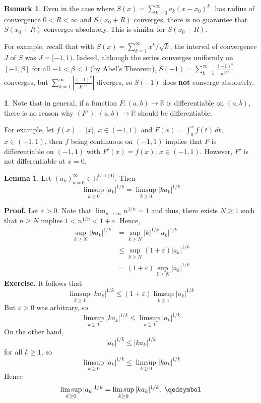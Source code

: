 \documentclass[11pt]{article}
\theoremstyle{definition}
\newtheorem{lemma}[thm]{Lemma}
\newtheorem{remark}[thm]{Remark}
\newtheorem{none}[thm]{}
\newcommand{\mbN}{\ensuremath{\mathbb{N}}}
\newcommand{\mbR}{\ensuremath{\mathbb{R}}}
\newcommand{\powerseries}{\ensuremath{S(x) = \sum_{k=0}^\infty a_k (x - x_0)^k \text{ }}}
\begin{document}
\begin{remark}
Even in the case where \powerseries has radius of convergence $0 < R < \infty$ and $S(x_0 + R)$ converges, there is no guarantee that $S(x_0 + R)$ converges absolutely. This is similar for $S(x_0 - R)$.

For example, recall that with $S(x) = \sum_{k=1}^\infty x^k / \sqrt{k}$, the interval of convergence $J$ of $S$ was $J = [-1, 1)$. Indeed, although the series converges uniformly on $[-1, \beta]$ for all $-1 < \beta < 1$ (by Abel's Theorem), $S(-1) = \sum_{k=1}^\infty \frac{(-1)^k}{k^{1/2}}$ converges, but $\sum_{k=1}^\infty \left| \frac{(-1)^k}{k^{1/2}} \right|$ diverges, so $S(-1)$ does \textbf{not} converge absolutely.
\end{remark}

\begin{none}
Note that in general, if a function $F : (a, b) \to \mbR$ is differentiable on $(a, b)$, there is no reason why $(F') : (a, b) \to \mbR$ should be differentiable.

For example, let $f(x) = |x|$, $x \in (-1, 1)$ and $F(x) = \int_0^x f(t)\,dt$, $x \in (-1, 1)$, then $f$ being continuous on $(-1, 1)$ implies that $F$ is differentiable on $(-1, 1)$ with $F'(x) = f(x)$, $x \in (-1, 1)$. However, $F'$ is not differentiable at $x = 0$.
\end{none}

\begin{lemma}
Let $(a_k)_{k=0}^\infty \in \mbR^{\mbN \cup \{0\}}$. Then
$$\limsup_{k\geq0} |a_k|^{1/k} = \limsup_{k\geq0} |ka_k|^{1/k}$$
\end{lemma}
\textbf{Proof.} Let $\varepsilon > 0$. Note that $\lim_{n\to\infty} n^{1/n} = 1$ and thus, there exists $N \geq 1$ such that $n \geq N$ implies $1 < n^{1/n} < 1 + \varepsilon$. Hence,
\begin{align*}
\sup_{k\geq N} |ka_k|^{1/k} & = \sup_{k\geq N} |k|^{1/k} |a_k|^{1/k} \\
& \leq \sup_{k\geq N} (1+\varepsilon) |a_k|^{1/k} \\
& = (1+\varepsilon) \sup_{k\geq N} |a_k|^{1/k}
\end{align*}
\textbf{Exercise.} It follows that
$$\limsup_{k\geq1} |ka_k|^{1/k} \leq (1+\varepsilon) \limsup_{k\geq1} |a_k|^{1/k}$$
But $\varepsilon > 0$ was arbitrary, so
$$\limsup_{k\geq1} |ka_k|^{1/k} \leq \limsup_{k\geq1} |a_k|^{1/k}$$
On the other hand,
$$|a_k|^{1/k} \leq |ka_k|^{1/k}$$
for all $k \geq 1$, so
$$\limsup_{k\geq0} |a_k|^{1/k} \leq \limsup_{k\geq0} |ka_k|^{1/k}$$
Hence
$$\limsup_{k\geq0} |a_k|^{1/k} = \limsup_{k\geq0} |ka_k|^{1/k} \text{. } \qedsymbol$$
\end{document}
